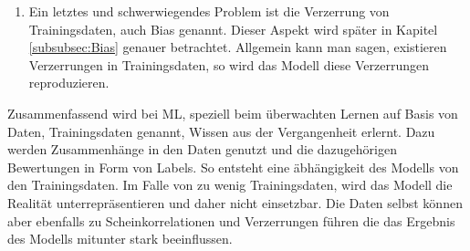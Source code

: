 \begin{onehalfspace}
\begin{enumerate}
\begin{figure}[h]
                \label{fig:Scheinkorrelation}
            \end{figure} \\
            Ein Beispiel dafür ist in Abbildung \ref*{fig:Scheinkorrelation} zu sehen. In der ein Pferdebild nicht anhand der Kontur des Pferdes, sondern anhand des Wasserzeichens in dem Bild erkannt wurde. Grund dafür war, dass einige der Trainingsdaten dieses Wasserzeichen beinhaltet haben und das Modell daraus eine Scheinkorrelation erlernt hat. \cite{Horn2022}\cite{Lapuschkin2016}\cite{Cremers2019}
            \item Ein letztes und schwerwiegendes Problem ist die Verzerrung von Trainingsdaten, auch Bias genannt. Dieser Aspekt wird später in Kapitel \ref*{subsubsec:Bias} genauer betrachtet. Allgemein kann man sagen, existieren Verzerrungen in Trainingsdaten, so wird das Modell diese Verzerrungen reproduzieren.\cite{Cremers2019}
        \end{enumerate}
        Zusammenfassend wird bei \ac*{ML}, speziell beim überwachten Lernen auf Basis von Daten, Trainingsdaten genannt, Wissen aus der Vergangenheit erlernt. Dazu werden Zusammenhänge in den Daten genutzt und die dazugehörigen Bewertungen in Form von Labels. So entsteht eine äbhängigkeit des Modells von den Trainingsdaten. Im Falle von zu wenig Trainingsdaten, wird das Modell die Realität unterrepräsentieren und daher nicht einsetzbar. Die Daten selbst können aber ebenfalls zu Scheinkorrelationen und Verzerrungen führen die das Ergebnis des Modells mitunter stark beeinflussen. \cite{Cremers2019}
 
    \newpage

\end{onehalfspace}
